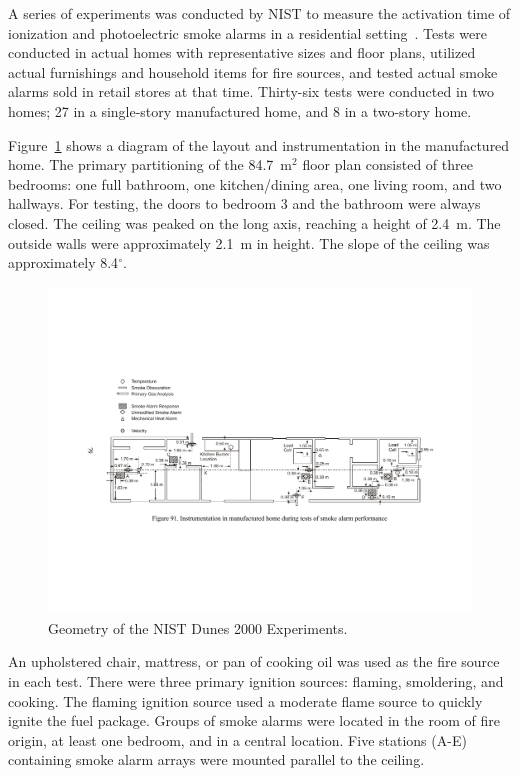 A series of experiments was conducted by NIST to measure the activation time of ionization and photoelectric
smoke alarms in a residential setting~\cite{Bukowski:1}. Tests were conducted in actual homes with
representative sizes and floor plans, utilized actual furnishings and household items for fire sources,
and tested actual smoke alarms sold in retail stores at that time. Thirty-six tests were conducted in two
homes; 27 in a single-story manufactured home, and 8 in a two-story home.

Figure~\ref{NIST_Dunes_2000_Drawing} shows a diagram of the layout and instrumentation in the
manufactured home. The primary partitioning of the 84.7~m$^2$ floor plan consisted of three bedrooms:
one full bathroom, one kitchen/dining area, one living room, and two hallways. For testing, the doors
to bedroom 3 and the bathroom were always closed. The ceiling
was peaked on the long axis, reaching a height of 2.4~m. The outside walls
were approximately 2.1~m in height. The slope of the ceiling was approximately 8.4$^\circ$.

\begin{figure}[h]
\begin{center}
\includegraphics[width=6.5in]{FIGURES/NIST_Dunes_2000/NIST_Dunes_2000_Drawing}
\end{center}
\caption[Geometry of the NIST Dunes 2000 Experiments]{Geometry of the NIST Dunes 2000 Experiments.}
\label{NIST_Dunes_2000_Drawing}
\end{figure}

An upholstered chair, mattress, or pan of cooking oil was used as the fire source in each test.
There were three primary ignition sources: flaming, smoldering, and cooking.
The flaming ignition source used a moderate flame source to quickly ignite the fuel package.
Groups of smoke alarms were located in the room of fire origin, at least one bedroom, and
in a central location. Five stations (A-E) containing smoke alarm arrays were mounted parallel to the ceiling.

